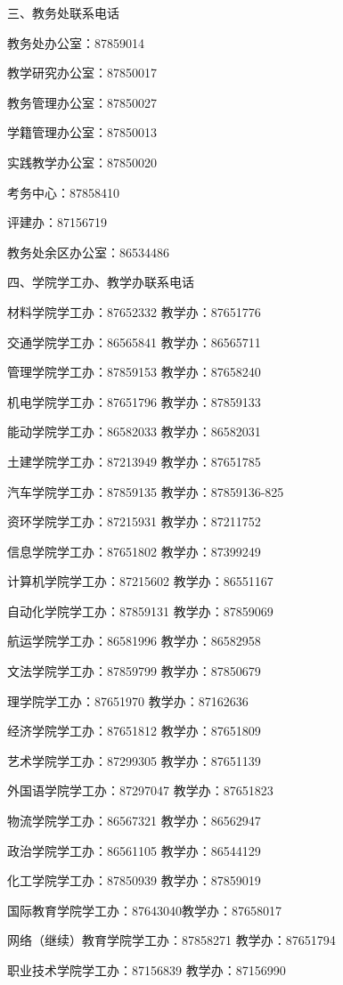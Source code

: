 \documentclass[UTF8,12pt,a4paper]{report}
\begin{document}
三、教务处联系电话

教务处办公室：87859014

教学研究办公室：87850017

教务管理办公室：87850027

学籍管理办公室：87850013

实践教学办公室：87850020

考务中心：87858410

评建办：87156719

教务处余区办公室：86534486



四、学院学工办、教学办联系电话

材料学院学工办：87652332 教学办：87651776

交通学院学工办：86565841 教学办：86565711

管理学院学工办：87859153 教学办：87658240

机电学院学工办：87651796 教学办：87859133

能动学院学工办：86582033 教学办：86582031

土建学院学工办：87213949 教学办：87651785

汽车学院学工办：87859135 教学办：87859136-825

资环学院学工办：87215931 教学办：87211752

信息学院学工办：87651802 教学办：87399249

计算机学院学工办：87215602 教学办：86551167

自动化学院学工办：87859131 教学办：87859069

航运学院学工办：86581996 教学办：86582958

文法学院学工办：87859799 教学办：87850679

理学院学工办：87651970 教学办：87162636

经济学院学工办：87651812 教学办：87651809

艺术学院学工办：87299305 教学办：87651139

外国语学院学工办：87297047 教学办：87651823

物流学院学工办：86567321 教学办：86562947

政治学院学工办：86561105 教学办：86544129

化工学院学工办：87850939 教学办：87859019

国际教育学院学工办：87643040教学办：87658017

网络（继续）教育学院学工办：87858271 教学办：87651794

职业技术学院学工办：87156839 教学办：87156990
\end{document}
